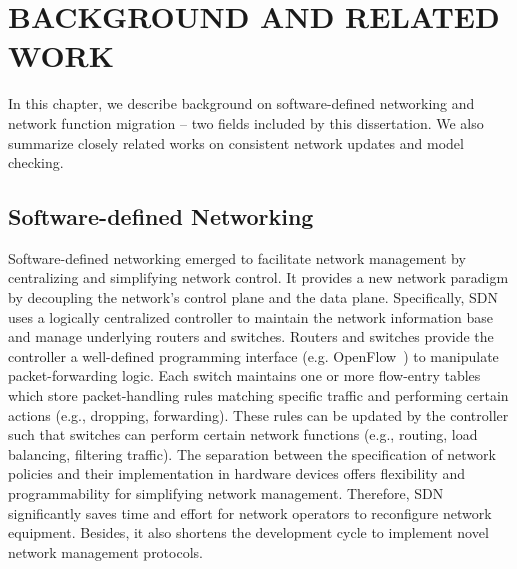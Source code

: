\chapter{\uppercase{Background and Related Work}}
\label{chap:related}

In this chapter, we describe background on software-defined networking and network function migration -- two fields included by this dissertation. We also summarize closely related works on consistent network updates and model checking.


\section{Software-defined Networking}
\label{sec:sdn}

Software-defined networking emerged to facilitate network management by centralizing and simplifying network control. It provides a new network paradigm by decoupling the network's control plane and the data plane. Specifically, SDN uses a logically centralized controller to maintain the network information base and manage underlying routers and switches. Routers and switches provide the controller a well-defined programming interface (e.g. OpenFlow{~\cite{OpenFlowSpec}}) to manipulate packet-forwarding logic. Each switch maintains one or more flow-entry tables which store packet-handling rules matching specific traffic and performing certain actions (e.g., dropping, forwarding). These rules can be updated by the controller such that switches can perform certain network functions (e.g., routing, load balancing, filtering traffic). The separation between the specification of network policies and their implementation in hardware devices offers flexibility and programmability for simplifying network management. Therefore, SDN significantly saves time and effort for network operators to reconfigure network equipment. Besides, it also shortens the development cycle to implement novel network management protocols.


